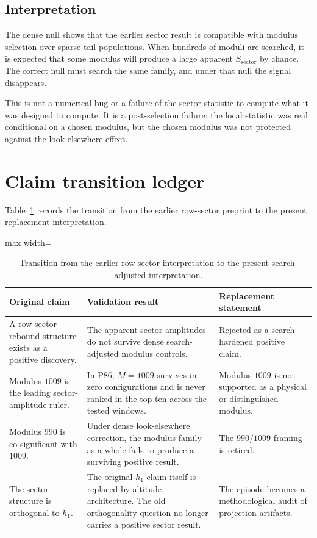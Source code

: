 \documentclass[11pt]{article}
\begin{document}
\subsection{Interpretation}

The dense null shows that the earlier sector result is compatible with modulus selection over sparse tail populations. When hundreds of moduli are searched, it is expected that some modulus will produce a large apparent \(S_{\mathrm{sector}}\) by chance. The correct null must search the same family, and under that null the signal disappears.

This is not a numerical bug or a failure of the sector statistic to compute what it was designed to compute. It is a post-selection failure: the local statistic was real conditional on a chosen modulus, but the chosen modulus was not protected against the look-elsewhere effect.

\section{Claim transition ledger}

Table~\ref{tab:claim-ledger} records the transition from the earlier row-sector preprint to the present replacement interpretation.

\begin{table}[H]
\centering
\small
\begin{adjustbox}{max width=\textwidth}
\begin{tabular}{p{}p{}p{}}
\toprule
\textbf{Original claim} & \textbf{Validation result} & \textbf{Replacement statement} \\
\midrule
A row-sector rebound structure exists as a positive discovery. &
The apparent sector amplitudes do not survive dense search-adjusted modulus controls. &
Rejected as a search-hardened positive claim. \\
\midrule
Modulus \(1009\) is the leading sector-amplitude ruler. &
In P86, \(M=1009\) survives in zero configurations and is never ranked in the top ten across the tested windows. &
Modulus \(1009\) is not supported as a physical or distinguished modulus. \\
\midrule
Modulus \(990\) is co-significant with \(1009\). &
Under dense look-elsewhere correction, the modulus family as a whole fails to produce a surviving positive result. &
The \(990/1009\) framing is retired. \\
\midrule
The sector structure is orthogonal to \(h_1\). &
The original \(h_1\) claim itself is replaced by altitude architecture. The old orthogonality question no longer carries a positive sector result. &
The episode becomes a methodological audit of projection artifacts. \\
\bottomrule
\end{tabular}
\end{adjustbox}
\caption{Transition from the earlier row-sector interpretation to the present search-adjusted interpretation.}
\label{tab:claim-ledger}
\end{table}
\end{document}
